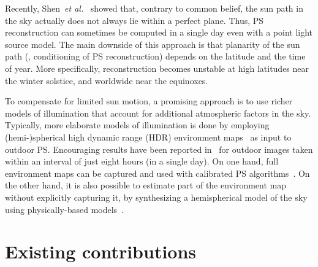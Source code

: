 \documentclass{report}
\begin{document}
Recently, Shen~{\em et al.}~\cite{shen-pg-14} showed that, contrary to common belief, the sun path in the sky actually does not always lie within a perfect plane. Thus, PS reconstruction can sometimes be computed in a single day even with a point light source model. The main downside of this approach is that planarity of the sun path (\ie, conditioning of PS reconstruction) depends on the latitude and the time of year. More specifically, reconstruction becomes unstable at high latitudes near the winter solstice, and worldwide near the equinoxes.

To compensate for limited sun motion, a promising approach is to use richer models of illumination that account for additional atmospheric factors in the sky. Typically, more elaborate models of illumination is done by employing (hemi-)spherical high dynamic range (HDR) environment maps~\cite{debevec-siggraph-98,reinhard-book-05} as input to outdoor PS. Encouraging results have been reported in~\cite{yu-iccp-13} for outdoor images taken within an interval of just eight hours (in a single day). On one hand, full environment maps can be captured and used with calibrated PS algorithms~\cite{yu-iccp-13,shi-3dv-14,hung-wacv-15}. On the other hand, it is also possible to estimate part of the environment map without explicitly capturing it, by synthesizing a hemispherical model of the sky using physically-based models~\cite{inose-tcva-13,jung-cvpr-15}.



\chapter{Existing contributions}
\label{}
\end{document}
